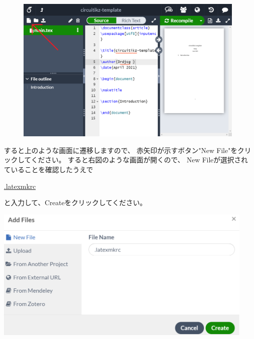 			\begin{figure}[H]
				\centering
				\includegraphics[width=\textwidth]{overleaf-editer-initial.png}
			\end{figure}

			\noindent
			\begin{minipage}{0.4\hsize}%
				すると上のような画面に遷移しますので、
				赤矢印が示すボタン"New File"をクリックしてください。
				すると右図のような画面が開くので、
				New Fileが選択されていることを確認したうえで
				\begin{mdframed}[style=shadow]
					\url{.latexmkrc}
				\end{mdframed}\vspace{-3mm}
				と入力して、Createをクリックしてください。
			\end{minipage}\hfill
			\begin{minipage}{0.6\hsize}
				\begin{flushright}
					\includegraphics[width=0.95\textwidth]{overleaf-editer-newfile.png}		
				\end{flushright}
			\end{minipage}

